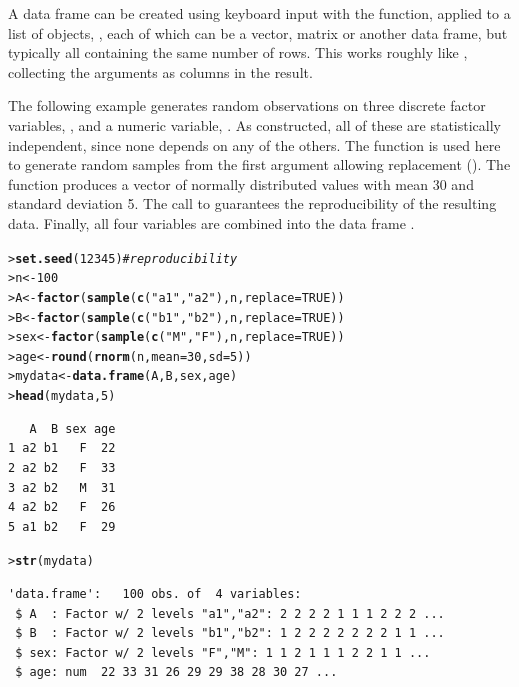 \documentclass[10pt,krantz2]{krantz}\usepackage[]{graphicx}\usepackage[]{color}
\makeatletter
\newcommand{\hlnum}[1]{\textcolor[rgb]{0.686,0.059,0.569}{#1}}%
\newcommand{\hlstr}[1]{\textcolor[rgb]{0.192,0.494,0.8}{#1}}%
\newcommand{\hlcom}[1]{\textcolor[rgb]{0.678,0.584,0.686}{\textit{#1}}}%
\newcommand{\hlstd}[1]{\textcolor[rgb]{0.345,0.345,0.345}{#1}}%
\newcommand{\hlkwb}[1]{\textcolor[rgb]{0.69,0.353,0.396}{#1}}%
\newcommand{\hlkwc}[1]{\textcolor[rgb]{0.333,0.667,0.333}{#1}}%
\newcommand{\hlkwd}[1]{\textcolor[rgb]{0.737,0.353,0.396}{\textbf{#1}}}%
\newenvironment{kframe}{%
 \def\at@end@of@kframe{}%
 \ifinner\ifhmode%
  \def\at@end@of@kframe{\end{minipage}}%
  \begin{minipage}{\columnwidth}%
 \fi\fi%
 \def\FrameCommand##1{\hskip\@totalleftmargin \hskip-\fboxsep
 \colorbox{shadecolor}{##1}\hskip-\fboxsep
     \hskip-\linewidth \hskip-\@totalleftmargin \hskip\columnwidth}%
 \MakeFramed {\advance\hsize-\width
   \@totalleftmargin\z@ \linewidth\hsize
   \@setminipage}}%
 {\par\unskip\endMakeFramed%
 \at@end@of@kframe}
\newenvironment{knitrout}{}{} %
\renewenvironment{knitrout}{\small\renewcommand{\baselinestretch}{.85}}{} %
\makeatother
\begin{document}
A data frame can be created using keyboard input
with the  function, applied to a list of objects,
, each of which can be a vector, matrix or another
data frame, but typically all containing the same number of rows.
This works roughly like , collecting the arguments as columns
in the result.

The following example generates  random observations on
three discrete factor variables, , and a numeric
variable, .  As constructed, all of these are
statistically independent, since none depends on any of the others.
The function 
is used here to generate  random samples from the
first argument allowing replacement ().
The  function produces a vector of  normally
distributed values with mean 30 and standard deviation 5.
The call to  guarantees the reproducibility of the
resulting data. 
Finally, all four variables are combined into the data frame
.


\begin{knitrout}
\color{fgcolor}\begin{kframe}
\begin{alltt}
\hlstd{> }\hlkwd{set.seed}\hlstd{(}\hlnum{12345}\hlstd{)}   \hlcom{# reproducibility}
\hlstd{> }\hlstd{n} \hlkwb{<-} \hlnum{100}
\hlstd{> }\hlstd{A} \hlkwb{<-} \hlkwd{factor}\hlstd{(}\hlkwd{sample}\hlstd{(}\hlkwd{c}\hlstd{(}\hlstr{"a1"}\hlstd{,} \hlstr{"a2"}\hlstd{), n,} \hlkwc{replace} \hlstd{=} \hlnum{TRUE}\hlstd{))}
\hlstd{> }\hlstd{B} \hlkwb{<-} \hlkwd{factor}\hlstd{(}\hlkwd{sample}\hlstd{(}\hlkwd{c}\hlstd{(}\hlstr{"b1"}\hlstd{,} \hlstr{"b2"}\hlstd{), n,} \hlkwc{replace} \hlstd{=} \hlnum{TRUE}\hlstd{))}
\hlstd{> }\hlstd{sex} \hlkwb{<-} \hlkwd{factor}\hlstd{(}\hlkwd{sample}\hlstd{(}\hlkwd{c}\hlstd{(}\hlstr{"M"}\hlstd{,} \hlstr{"F"}\hlstd{), n,} \hlkwc{replace} \hlstd{=} \hlnum{TRUE}\hlstd{))}
\hlstd{> }\hlstd{age} \hlkwb{<-} \hlkwd{round}\hlstd{(}\hlkwd{rnorm}\hlstd{(n,} \hlkwc{mean} \hlstd{=} \hlnum{30}\hlstd{,} \hlkwc{sd} \hlstd{=} \hlnum{5}\hlstd{))}
\hlstd{> }\hlstd{mydata} \hlkwb{<-} \hlkwd{data.frame}\hlstd{(A, B, sex, age)}
\hlstd{> }\hlkwd{head}\hlstd{(mydata,} \hlnum{5}\hlstd{)}
\end{alltt}
\begin{verbatim}
   A  B sex age
1 a2 b1   F  22
2 a2 b2   F  33
3 a2 b2   M  31
4 a2 b2   F  26
5 a1 b2   F  29
\end{verbatim}
\begin{alltt}
\hlstd{> }\hlkwd{str}\hlstd{(mydata)}
\end{alltt}
\begin{verbatim}
'data.frame':	100 obs. of  4 variables:
 $ A  : Factor w/ 2 levels "a1","a2": 2 2 2 2 1 1 1 2 2 2 ...
 $ B  : Factor w/ 2 levels "b1","b2": 1 2 2 2 2 2 2 2 1 1 ...
 $ sex: Factor w/ 2 levels "F","M": 1 1 2 1 1 1 2 2 1 1 ...
 $ age: num  22 33 31 26 29 29 38 28 30 27 ...
\end{verbatim}
\end{kframe}
\end{knitrout}
\end{document}
